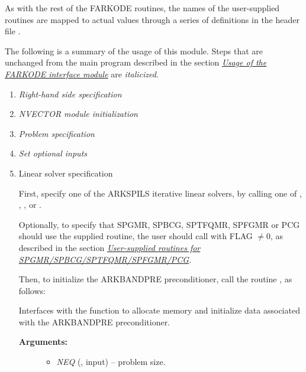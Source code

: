 \documentclass[letterpaper,10pt,english]{sphinxmanual}
\begin{document}
As with the rest of the FARKODE routines, the names of the
user-supplied routines are mapped to actual values through a series of
definitions in the header file .

The following is a summary of the usage of this module.  Steps that
are unchanged from the main program described in the section
{\hyperref[f_interface/Usage:finterface-usage]{\emph{Usage of the FARKODE interface module}}} are \emph{italicized}.
\begin{enumerate}
\item {} 
\emph{Right-hand side specification}

\item {} 
\emph{NVECTOR module initialization}

\item {} 
\emph{Problem specification}

\item {} 
\emph{Set optional inputs}

\item {} 
Linear solver specification

First, specify one of the ARKSPILS iterative linear solvers, by
calling one of {\hyperref[f_interface/Usage:f/_/FARKSPGMR]{}}, {\hyperref[f_interface/Usage:f/_/FARKSPBCG]{}},
{\hyperref[f_interface/Usage:f/_/FARKSPTFQMR]{}}, {\hyperref[f_interface/Usage:f/_/FARKSPFGMR]{}} or
{\hyperref[f_interface/Usage:f/_/FARKPCG]{}}.

Optionally, to specify that SPGMR, SPBCG, SPTFQMR, SPFGMR or PCG
should use the supplied {\hyperref[f_interface/Usage:f/_/FARKJTIMES]{}} routine, the user
should call {\hyperref[f_interface/Usage:f/_/FARKSPILSSETJAC]{}} with FLAG $\ne 0$,
as described in the section {\hyperref[f_interface/Usage:finterface-spilsusersupplied]{\emph{User-supplied routines for SPGMR/SPBCG/SPTFQMR/SPFGMR/PCG}}}.

Then, to initialize the ARKBANDPRE preconditioner, call the
routine {\hyperref[f_interface/Preconditioning:f/_/FARKBPINIT]{}}, as follows:

\begin{fulllineitems}
\label{f_interface/Preconditioning:f/_/FARKBPINIT}
Interfaces with the {\hyperref[c_interface/Preconditioners:ARKBandPrecInit]{}}
function to allocate memory and initialize data associated
with the ARKBANDPRE preconditioner.
\begin{description}
\item[{\textbf{Arguments:}}] \leavevmode\begin{itemize}
\item {} 
\emph{NEQ} (, input) -- problem size.


\end{itemize}
\end{description}
\end{fulllineitems}
\end{enumerate}
\end{document}
